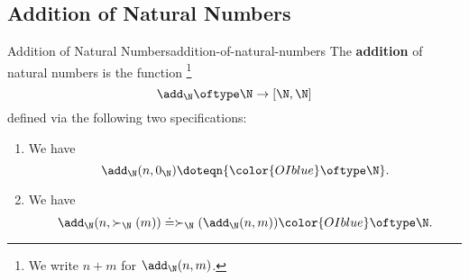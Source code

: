 \subsection{Addition of Natural Numbers}\label{subsection-addition-of-natural-numbers}
\begin{definition}{Addition of Natural Numbers}{addition-of-natural-numbers}%
    The \textbf{addition} of natural numbers is the function%
    \footnote{%
        We write $n+m$ for $\add_{\N}(n,m)$.
        \par\vspace*{\TCBBoxCorrection}
    }%
    \[
        \add_{\N}%
        \oftype%
        \N%
        \to%
        [\N,\N]%
    \]%
    defined via the following two specifications:%
    \begin{enumerate}
        \item\label{addition-of-natural-numbers-the-base-case}We have
            \[
                \add_{\N}(n,0_{\N})%
                \doteq%
                n%
                {\color{OIblue}\oftype\N}.%
            \]%
        \item\label{addition-of-natural-numbers-the-inductive-step}We have
            \[
                \add_{\N}(n,\succ_{\N}(m))%
                \doteq%
                \succ_{\N}(\add_{\N}(n,m))%
                {\color{OIblue}\oftype\N}.%
            \]%
    \end{enumerate}
\end{definition}
